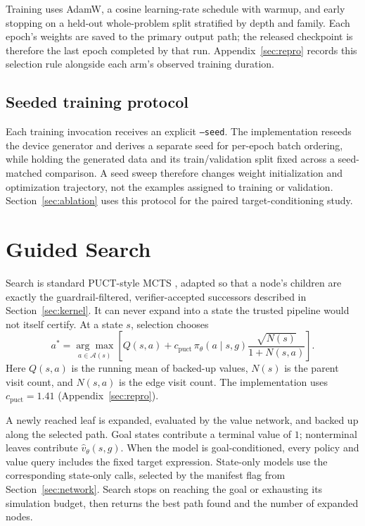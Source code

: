 \documentclass[11pt]{article}
\numberwithin{equation}{section}
\begin{document}
Training uses AdamW, a cosine learning-rate schedule with warmup, and early stopping on a held-out whole-problem split stratified by depth and family. Each epoch's weights are saved to the primary output path; the released checkpoint is therefore the last epoch completed by that run. Appendix~\ref{sec:repro} records this selection rule alongside each arm's observed training duration.

\subsection{Seeded training protocol}
\label{sec:seed-bug}

Each training invocation receives an explicit \texttt{--seed}. The implementation reseeds the device generator and derives a separate seed for per-epoch batch ordering, while holding the generated data and its train/validation split fixed across a seed-matched comparison. A seed sweep therefore changes weight initialization and optimization trajectory, not the examples assigned to training or validation. Section~\ref{sec:ablation} uses this protocol for the paired target-conditioning study.

\section{Guided Search}
\label{sec:search}

Search is standard PUCT-style MCTS \citep{silver2018alphazero}, adapted so that a node's children are exactly the guardrail-filtered, verifier-accepted successors described in Section~\ref{sec:kernel}. It can never expand into a state the trusted pipeline would not itself certify. At a state $s$, selection chooses
\begin{equation}
a^*=\underset{a\in\mathcal{A}(s)}{\arg\max}\left[
Q(s,a)+c_{\mathrm{puct}}\,\pi_\theta(a\mid s,g)
\frac{\sqrt{N(s)}}{1+N(s,a)}
\right].
\label{eq:puct}
\end{equation}
Here $Q(s,a)$ is the running mean of backed-up values, $N(s)$ is the parent visit count, and $N(s,a)$ is the edge visit count. The implementation uses $c_{\mathrm{puct}}=1.41$ (Appendix~\ref{sec:repro}).

A newly reached leaf is expanded, evaluated by the value network, and backed up along the selected path. Goal states contribute a terminal value of $1$; nonterminal leaves contribute $\hat v_\theta(s,g)$. When the model is goal-conditioned, every policy and value query includes the fixed target expression. State-only models use the corresponding state-only calls, selected by the manifest flag from Section~\ref{sec:network}. Search stops on reaching the goal or exhausting its simulation budget, then returns the best path found and the number of expanded nodes.
\end{document}
